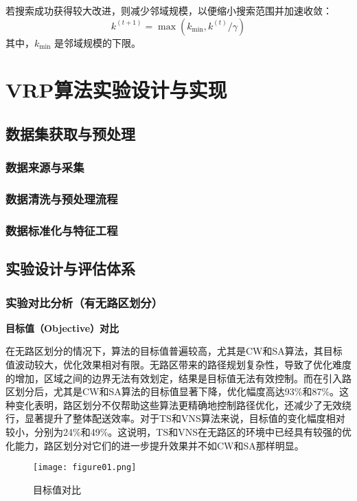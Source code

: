 \documentclass[12pt,a4paper,twoside]{ctexbook}
\let\oldchapter\chapter
\renewcommand{\chapter}{\clearpage\oldchapter}  %
\begin{document}
若搜索成功获得较大改进，则减少邻域规模，以便缩小搜索范围并加速收敛：
\[
k^{(t+1)} = \max(k_{\min}, k^{(t)} / \gamma)
\]
其中，$k_{\min}$ 是邻域规模的下限。


\chapter{VRP算法实验设计与实现}

\section{数据集获取与预处理}

\subsection{数据来源与采集}

\subsection{数据清洗与预处理流程}

\subsection{数据标准化与特征工程}

\section{实验设计与评估体系}

\subsection{实验对比分析（有无路区划分）}

\textbf{目标值（Objective）对比}

在无路区划分的情况下，算法的目标值普遍较高，尤其是CW和SA算法，其目标值波动较大，优化效果相对有限。无路区带来的路径规划复杂性，导致了优化难度的增加，区域之间的边界无法有效划定，结果是目标值无法有效控制。而在引入路区划分后，尤其是CW和SA算法的目标值显著下降，优化幅度高达93\%和87\%。这种变化表明，路区划分不仅帮助这些算法更精确地控制路径优化，还减少了无效绕行，显著提升了整体配送效率。对于TS和VNS算法来说，目标值的变化幅度相对较小，分别为24\%和49\%。这说明，TS和VNS在无路区的环境中已经具有较强的优化能力，路区划分对它们的进一步提升效果并不如CW和SA那样明显。

\begin{figure}[H]
    \centering
    \texttt{[image: figure01.png]} %
    \caption{目标值对比}
    \label{fig:objective_comparison}
\end{figure}
\end{document}
